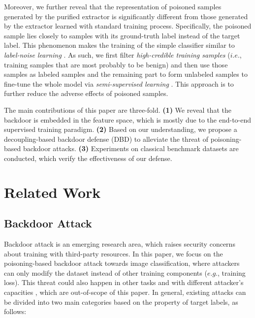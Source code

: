Moreover, we further reveal that the representation of poisoned samples generated by the purified extractor is significantly different from those generated by the extractor learned with standard training process. Specifically, the poisoned sample lies closely to samples with its ground-truth label instead of the target label. This phenomenon makes the training of the simple classifier similar to \emph{label-noise learning} \citep{wang2019symmetric,ma2020normalized,berthon2021confidence}. As such, we first filter \emph{high-credible training samples} ($i.e.$, training samples that are most probably to be benign) and then use those samples as labeled samples and the remaining part to form unlabeled samples to fine-tune the whole model via \emph{semi-supervised learning} \citep{rasmus2015semi,berthelot2019mixmatch,sohn2020fixmatch}. This approach is to further reduce the adverse effects of poisoned samples.

The main contributions of this paper are three-fold. \textbf{(1)} We reveal that the backdoor is embedded in the feature space, which is mostly due to the end-to-end supervised training paradigm. \textbf{(2)} Based on our understanding, we propose a decoupling-based backdoor defense (DBD) to alleviate the threat of poisoning-based backdoor attacks. \textbf{(3)} Experiments on classical benchmark datasets are conducted, which verify the effectiveness of our defense.

\vspace{-0.5em}
\section{Related Work}
\vspace{-0.5em}

\subsection{Backdoor Attack}
\label{sec:related_attack}

Backdoor attack is an emerging research area, which raises security concerns about training with third-party resources. In this paper, we focus on the poisoning-based backdoor attack towards image classification, where attackers can only modify the dataset instead of other training components ($e.g.$, training loss). This threat could also happen in other tasks \citep{xiang2021backdoor,zhai2021backdoor,li2022few} and with different attacker's capacities \citep{nguyen2020input,tang2020embarrassingly,zeng2021rethinking}, which are out-of-scope of this paper. 
In general, existing attacks can be divided into two main categories based on the property of target labels, as follows:


